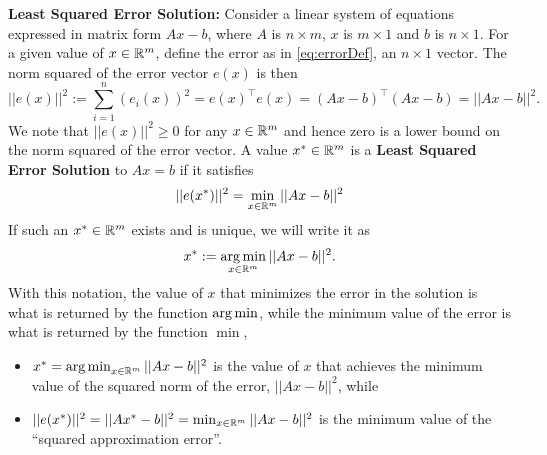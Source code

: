 \begin{tcolorbox}
\textbf{Least Squared Error Solution:} Consider a linear system of equations expressed in matrix form $Ax-b$, where $A$ is $n \times m$, $x$ is $m \times 1$ and $b$ is $n \times 1$. For a given value of $x\in \mathbb R^m$, define the error as in \eqref{eq:errorDef}, an $n \times 1$ vector. The norm squared of the error vector $e(x)$ is then
\begin{equation}
    \label{eq:LeastSquaredError}
    ||e(x)||^2 := \sum_{i=1}^{n} (e_i(x))^2= e(x)^\top e(x) = (Ax-b)^\top (Ax-b)=|| Ax-b||^2.
\end{equation}
We note that $||e(x)||^2 \ge 0$ for any $x \in \mathbb R^m$ and hence zero is a lower bound on the norm squared of the error vector. A value $x^\ast \in \mathbb R^m$ is a \textbf{Least Squared Error Solution} to $Ax=b$ if it satisfies
\begin{equation}
    \label{eq:DefLeastSqaredErrorSolution}
    ||e(x^\ast)||^2 = \min_{x \in \mathbb R^m} ||Ax-b ||^2
\end{equation}
If such an $x^\ast \in \mathbb R^m$ exists and is unique, we will write it as 
\begin{equation}
    \label{eq:DefArgMinLeastSqaredErrorSolution}
    x^\ast := \operatorname*{arg\,min}_{x \in \mathbb R^m} ||Ax-b ||^2.
\end{equation}
With this notation, the value of $x$ that minimizes the error in the solution is what is returned by the function $\operatorname*{arg\,min}$, while the minimum value of the error is what is returned by the function $\min$,
\begin{itemize}
    \item $x^\ast = \operatorname*{arg\,min}_{x \in \mathbb R^m} ||Ax-b ||^2$ is the value of $x$ that achieves the minimum value of the squared norm of the error, $||Ax-b||^2$, while
    \item $||e(x^\ast)||^2 = ||Ax^\ast - b||^2 = \min_{x \in \mathbb R^m} ||Ax-b ||^2$ is the minimum value of the ``squared approximation error''.
\end{itemize}

\end{tcolorbox}


